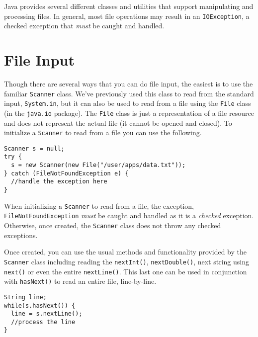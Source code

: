 

Java provides several different classes and 
utilities that support manipulating and processing
files.  In general, most file operations may
result in an \texttt{IOException}, 
a checked exception that \emph{must} be caught
and handled.

\section{File Input}

Though there are several ways that you can do file
input, the easiest is to use the familiar 
\texttt{Scanner} class.  We've previously
used this class to read from the standard input, 
\texttt{System.in}, but it can also be
used to read from a file using the \texttt{File} 
class (in the \texttt{java.io} package).  
The \texttt{File} class is just
a representation of a file resource and does not
represent the actual file (it cannot be opened and
closed).  To initialize a \texttt{Scanner} to read
from a file you can use the following.

\begin{verbatim}
Scanner s = null;
try {
  s = new Scanner(new File("/user/apps/data.txt"));
} catch (FileNotFoundException e) {
  //handle the exception here
}
\end{verbatim}

When initializing a \texttt{Scanner} to
read from a file, the exception, 
\texttt{FileNotFoundException} \emph{must} be caught
and handled as it is a \emph{checked} exception.  Otherwise, once created, the \texttt{Scanner}
class does not throw any checked exceptions.

Once created, you can use the usual methods and functionality
provided by the \texttt{Scanner} class including
reading the \texttt{nextInt()}, \texttt{nextDouble()}, 
next string using \texttt{next()} or even the
entire \texttt{nextLine()}.  This last one
can be used in conjunction with \texttt{hasNext()}
to read an entire file, line-by-line.

\begin{verbatim}
String line;
while(s.hasNext()) {
  line = s.nextLine();
  //process the line
}
\end{verbatim}

